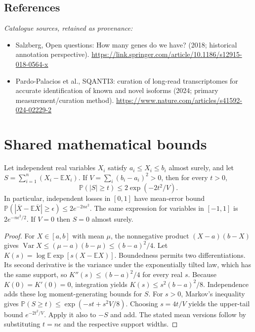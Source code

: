 \documentclass[11pt]{article}
\begin{document}
\subsection{References}
\noindent\emph{Catalogue sources, retained as provenance:}
\begin{itemize}
\item Salzberg, Open questions: How many genes do we have? (2018; historical annotation perspective). \url{https://link.springer.com/article/10.1186/s12915-018-0564-x}
\item Pardo-Palacios et al., SQANTI3: curation of long-read transcriptomes for accurate identification of known and novel isoforms (2024; primary measurement/curation method). \url{https://www.nature.com/articles/s41592-024-02229-2}
\end{itemize}




\section{Shared mathematical bounds}\label{app:bounds}
\begin{lemma}\label{lem:bounded}
Let independent real variables $X_i$ satisfy $a_i\leq X_i\leq b_i$ almost surely,
and let $S=\sum_{i=1}^n(X_i-\mathbb{E} X_i)$. If
$V=\sum_i(b_i-a_i)^2>0$, then for every $t>0$,
\[
 \mathbb{P}(|S|\geq t)\leq 2\exp(-2t^2/V).
\]
In particular, independent losses in $[0,1]$ have mean-error bound
$\mathbb{P}(|\overline X-\mathbb{E}\overline X|\geq\epsilon)
\leq2e^{-2n\epsilon^2}$. The same expression for variables in $[-1,1]$
is $2e^{-n\epsilon^2/2}$. If $V=0$ then $S=0$ almost surely.
\end{lemma}
\begin{proof}
For $X\in[a,b]$ with mean $\mu$, the nonnegative product
$(X-a)(b-X)$ gives
$\operatorname{Var} X\leq(\mu-a)(b-\mu)\leq(b-a)^2/4$.
Let $K(s)=\log\mathbb{E}\exp[s(X-\mathbb{E} X)]$.
Boundedness permits two differentiations. Its second derivative is the variance
under the exponentially tilted law, which has the same support, so
$K''(s)\leq(b-a)^2/4$ for every real $s$.
Because $K(0)=K'(0)=0$, integration yields
$K(s)\leq s^2(b-a)^2/8$.
Independence adds these log moment-generating bounds for $S$.
For $s>0$, Markov's inequality gives
$\mathbb{P}(S\geq t)\leq\exp(-st+s^2V/8)$.
Choosing $s=4t/V$ yields the upper-tail bound $e^{-2t^2/V}$.
Apply it also to $-S$ and add. The stated mean versions follow by substituting
$t=n\epsilon$ and the respective support widths.
\end{proof}
\end{document}
